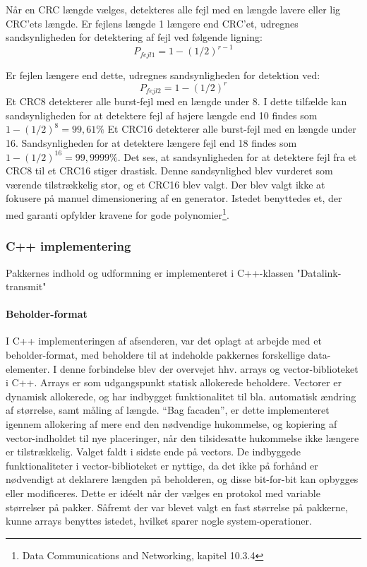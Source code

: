 Når en CRC længde vælges, detekteres alle fejl med en længde lavere eller lig CRC'ets længde. Er fejlens længde 1 længere end CRC'et, udregnes sandsynligheden for detektering af fejl ved følgende ligning:
\begin{equation}
\label{eq:CRCError}
P_{fejl1}=1-(1/2)^{r-1}
\end{equation}

Er fejlen længere end dette, udregnes sandsynligheden for detektion ved:
\begin{equation}
\label{eq:CRCError2}
P_{fejl2}=1-(1/2)^r
\end{equation}
Et CRC8 detekterer alle burst-fejl med en længde under 8. I dette tilfælde kan sandsynligheden for at detektere fejl af højere længde end 10 findes som $1-(1/2)^8 = 99,61\%$
Et CRC16 detekterer alle burst-fejl med en længde under 16. Sandsynligheden for at detektere længere fejl end 18 findes som $1-(1/2)^{16} = 99,9999\%.$
	Det ses, at sandsynligheden for at detektere fejl fra et CRC8 til et CRC16 stiger drastisk. Denne sandsynlighed blev vurderet som værende tilstrækkelig stor, og et CRC16 blev valgt.
    Der blev valgt ikke at fokusere på manuel dimensionering af en generator. Istedet benyttedes et, der med garanti opfylder kravene for gode polynomier\footnote{Data Communications and Networking, kapitel 10.3.4}.


\subsubsection{C++ implementering}
Pakkernes indhold og udformning er implementeret i C++-klassen "Datalink-transmit"


\paragraph{Beholder-format}\hfill \break
I C++ implementeringen af afsenderen, var det oplagt at arbejde med et beholder-format, med beholdere til at indeholde pakkernes forskellige data-elementer.
I denne forbindelse blev der overvejet hhv. arrays og vector-biblioteket i C++. 
Arrays er som udgangspunkt statisk allokerede beholdere.
Vectorer er dynamisk allokerede, og har indbygget funktionalitet til bla. automatisk ændring af størrelse, samt måling af længde. “Bag facaden”, er dette implementeret igennem allokering af mere end den nødvendige hukommelse, og kopiering af vector-indholdet til nye placeringer, når den tilsidesatte hukommelse ikke længere er tilstrækkelig. 
Valget faldt i sidste ende på vectors. De indbyggede funktionaliteter i vector-biblioteket er nyttige, da det ikke på forhånd er nødvendigt at deklarere længden på beholderen, og disse bit-for-bit kan opbygges eller modificeres. Dette er idéelt når der vælges en protokol med variable størrelser på pakker. Såfremt der var blevet valgt en fast størrelse på pakkerne, kunne arrays benyttes istedet, hvilket sparer nogle system-operationer.

